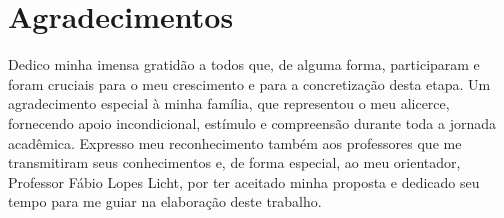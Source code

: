 \chapter*{\hfill Agradecimentos \hfill}
\thispagestyle{empty}

Dedico minha imensa gratidão a todos que, de alguma forma, participaram e foram cruciais para o meu crescimento e para a concretização desta etapa. Um agradecimento especial à minha família, que representou o meu alicerce, fornecendo apoio incondicional, estímulo e compreensão durante toda a jornada acadêmica.
Expresso meu reconhecimento também aos professores que me transmitiram seus conhecimentos e, de forma especial, ao meu orientador, Professor Fábio Lopes Licht, por ter aceitado minha proposta e dedicado seu tempo para me guiar na elaboração deste trabalho.

